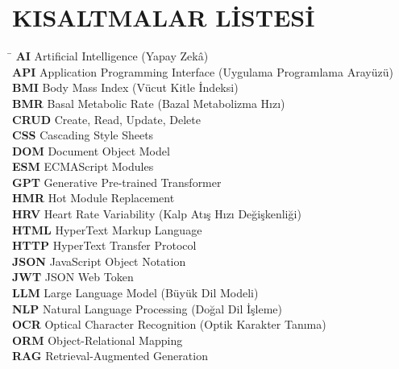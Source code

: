 \clearpage

\section*{KISALTMALAR LİSTESİ}

\begin{tabbing}
\hspace{4cm}\= \kill
\textbf{AI}       \> Artificial Intelligence (Yapay Zekâ) \\[4pt]
\textbf{API}      \> Application Programming Interface (Uygulama Programlama Arayüzü) \\[4pt]
\textbf{BMI}      \> Body Mass Index (Vücut Kitle İndeksi) \\[4pt]
\textbf{BMR}      \> Basal Metabolic Rate (Bazal Metabolizma Hızı) \\[4pt]
\textbf{CRUD}     \> Create, Read, Update, Delete \\[4pt]
\textbf{CSS}      \> Cascading Style Sheets \\[4pt]
\textbf{DOM}      \> Document Object Model \\[4pt]
\textbf{ESM}      \> ECMAScript Modules \\[4pt]
\textbf{GPT}      \> Generative Pre-trained Transformer \\[4pt]
\textbf{HMR}      \> Hot Module Replacement \\[4pt]
\textbf{HRV}      \> Heart Rate Variability (Kalp Atış Hızı Değişkenliği) \\[4pt]
\textbf{HTML}     \> HyperText Markup Language \\[4pt]
\textbf{HTTP}     \> HyperText Transfer Protocol \\[4pt]
\textbf{JSON}     \> JavaScript Object Notation \\[4pt]
\textbf{JWT}      \> JSON Web Token \\[4pt]
\textbf{LLM}      \> Large Language Model (Büyük Dil Modeli) \\[4pt]
\textbf{NLP}      \> Natural Language Processing (Doğal Dil İşleme) \\[4pt]
\textbf{OCR}      \> Optical Character Recognition (Optik Karakter Tanıma) \\[4pt]
\textbf{ORM}      \> Object-Relational Mapping \\[4pt]
\textbf{RAG}      \> Retrieval-Augmented Generation \\[4pt]

\end{tabbing}
